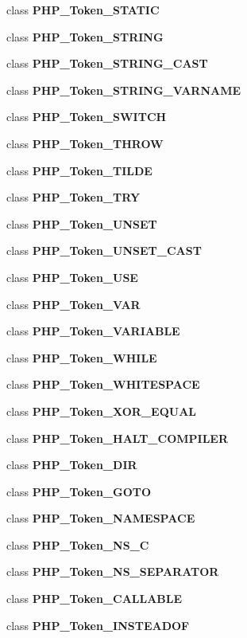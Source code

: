 \begin{DoxyCompactItemize}
\item 
class {\bf P\+H\+P\+\_\+\+Token\+\_\+\+S\+T\+A\+T\+I\+C}
\item 
class {\bf P\+H\+P\+\_\+\+Token\+\_\+\+S\+T\+R\+I\+N\+G}
\item 
class {\bf P\+H\+P\+\_\+\+Token\+\_\+\+S\+T\+R\+I\+N\+G\+\_\+\+C\+A\+S\+T}
\item 
class {\bf P\+H\+P\+\_\+\+Token\+\_\+\+S\+T\+R\+I\+N\+G\+\_\+\+V\+A\+R\+N\+A\+M\+E}
\item 
class {\bf P\+H\+P\+\_\+\+Token\+\_\+\+S\+W\+I\+T\+C\+H}
\item 
class {\bf P\+H\+P\+\_\+\+Token\+\_\+\+T\+H\+R\+O\+W}
\item 
class {\bf P\+H\+P\+\_\+\+Token\+\_\+\+T\+I\+L\+D\+E}
\item 
class {\bf P\+H\+P\+\_\+\+Token\+\_\+\+T\+R\+Y}
\item 
class {\bf P\+H\+P\+\_\+\+Token\+\_\+\+U\+N\+S\+E\+T}
\item 
class {\bf P\+H\+P\+\_\+\+Token\+\_\+\+U\+N\+S\+E\+T\+\_\+\+C\+A\+S\+T}
\item 
class {\bf P\+H\+P\+\_\+\+Token\+\_\+\+U\+S\+E}
\item 
class {\bf P\+H\+P\+\_\+\+Token\+\_\+\+V\+A\+R}
\item 
class {\bf P\+H\+P\+\_\+\+Token\+\_\+\+V\+A\+R\+I\+A\+B\+L\+E}
\item 
class {\bf P\+H\+P\+\_\+\+Token\+\_\+\+W\+H\+I\+L\+E}
\item 
class {\bf P\+H\+P\+\_\+\+Token\+\_\+\+W\+H\+I\+T\+E\+S\+P\+A\+C\+E}
\item 
class {\bf P\+H\+P\+\_\+\+Token\+\_\+\+X\+O\+R\+\_\+\+E\+Q\+U\+A\+L}
\item 
class {\bf P\+H\+P\+\_\+\+Token\+\_\+\+H\+A\+L\+T\+\_\+\+C\+O\+M\+P\+I\+L\+E\+R}
\item 
class {\bf P\+H\+P\+\_\+\+Token\+\_\+\+D\+I\+R}
\item 
class {\bf P\+H\+P\+\_\+\+Token\+\_\+\+G\+O\+T\+O}
\item 
class {\bf P\+H\+P\+\_\+\+Token\+\_\+\+N\+A\+M\+E\+S\+P\+A\+C\+E}
\item 
class {\bf P\+H\+P\+\_\+\+Token\+\_\+\+N\+S\+\_\+\+C}
\item 
class {\bf P\+H\+P\+\_\+\+Token\+\_\+\+N\+S\+\_\+\+S\+E\+P\+A\+R\+A\+T\+O\+R}
\item 
class {\bf P\+H\+P\+\_\+\+Token\+\_\+\+C\+A\+L\+L\+A\+B\+L\+E}
\item 
class {\bf P\+H\+P\+\_\+\+Token\+\_\+\+I\+N\+S\+T\+E\+A\+D\+O\+F}
\item 

\end{DoxyCompactItemize}
